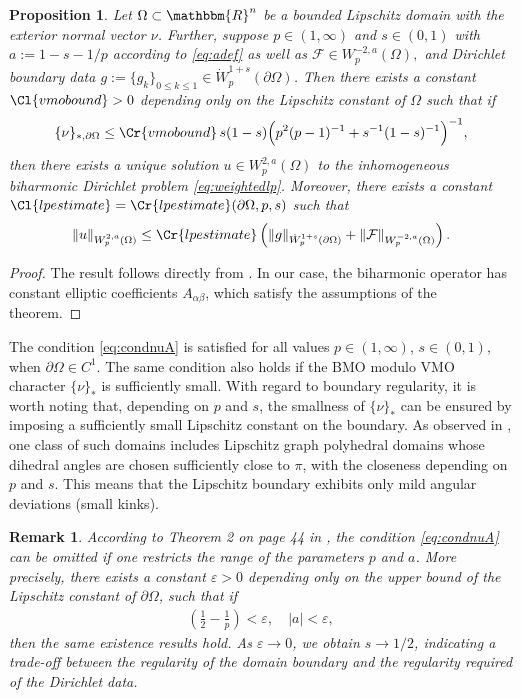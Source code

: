 \documentclass[12pt,a4paper,twoside]{article}
\newcommand{\R}{\mathbbm {R}}
\newtheorem{Proposition}[thm]{Proposition}
\newtheorem{remark}[thm]{Remark}
\begin{document}
\begin{Proposition} \label{thm:prop1}
Let $\Omega\subset \R^n$ be a bounded Lipschitz domain with the exterior normal vector $\nu$. Further, suppose $p\in (1,\infty)$ and $s\in(0,1)$ with $a:=1-s-1/p$ according to \eqref{eq:adef} as well as $\mathcal {F} \in W^{-2, a}_p(\Omega),$ and Dirichlet boundary data $ g:=\{g_k\}_{0\le k\le 1}\in \dot W^{1+s}_p(\partial \Omega)$. Then there exists a constant $\Cl{vmobound}>0$ depending only on the Lipschitz constant of $\Omega$ such that if
\begin{align}
\label{eq:condnuA}
\{\nu\}_{\ast,\partial\Omega}
\le \Cr{vmobound}\,s(1-s)\Big(p^2(p-1)^{-1}+s^{-1}(1-s)^{-1}\Big)^{-1}, %
\end{align}
then there exists a unique solution $u\in W^{2,a}_p(\Omega)$ to the inhomogeneous biharmonic Dirichlet problem \eqref{eq:weightedlp}. Moreover, there exists a constant $\Cl{lpestimate}=\Cr{lpestimate}(\partial\Omega, p,s)$ such that
\begin{align*}
    \|u\|_{W^{2,a}_p(\Omega)}\le \Cr{lpestimate} \left( \|g\|_{\dot W^{1+s}_p(\partial\Omega)} + \|\mathcal F \|_{W^{-2,a}_p(\Omega)} \right).
\end{align*}
\end{Proposition}
\begin{proof}
The result follows directly from \cite[ Theorem 8.1, p.233]{maz2010dirichlet}. In our case, the biharmonic operator has constant elliptic coefficients  $A_{\alpha\beta}$, which satisfy the assumptions of the theorem.
\end{proof}

The condition \eqref{eq:condnuA} is  satisfied for all values $p\in(1,\infty)$, $s\in(0,1)$, when $\partial \Omega\in C^1$. The same condition also holds if the BMO modulo VMO character $\{\nu\}_\ast$ is sufficiently small. With regard to boundary regularity, it is worth noting that, depending on $p$ and $s$, the smallness of $\{\nu\}_\ast$ can be ensured by imposing a sufficiently small Lipschitz constant on the boundary. As observed in \cite[p.43]{maz2011recent}, one class of such domains includes Lipschitz graph polyhedral domains whose dihedral angles are chosen sufficiently close to $\pi$, with the closeness depending on $p$ and $s$. This means that the Lipschitz boundary exhibits only mild angular deviations (small kinks).

\begin{remark} \label{remark:lipsch}
   According to Theorem 2 on page 44 in \cite{maz2011recent}, the condition \eqref{eq:condnuA} can be omitted if one restricts the range of the parameters $p$ and $a$. More precisely, there exists a constant $\varepsilon>0$ depending only on the upper bound of the Lipschitz constant of $\partial\Omega$, such that if
\begin{align}
\label{eq:condpae}
\left( \frac{1}{2} - \frac{1}{p} \right) < \varepsilon, \quad |a|<\varepsilon, %
\end{align}
then the same existence results hold. As $\varepsilon\to 0$, we obtain $s\to 1/2$, indicating a trade-off between the regularity of the domain boundary and the regularity required of the Dirichlet data.
\end{remark}
\end{document}
